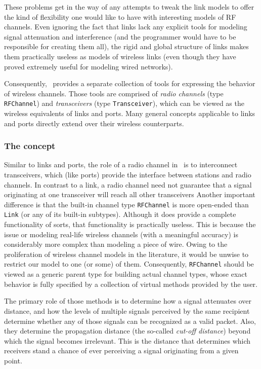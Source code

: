 These problems get in the way of any attempts to tweak the link models to
offer the kind of flexibility one would like to have with interesting models
of RF channels.
Even ignoring the fact that links lack any explicit tools for modeling
signal attenuation and interference (and the programmer would have to be
responsible for creating them all), the rigid and global structure of links
makes them practically useless as models of wireless links (even though they
have proved extremely useful for modeling wired networks).

Consequently, \smurph\ provides a separate collection of tools for expressing
the behavior of wireless channels.
Those tools are comprised of {\em radio channels\/} (type {\tt RFChannel}) and
{\em transceivers\/} (type {\tt Transceiver}),
which can be viewed as the wireless equivalents of links and ports.
Many general concepts applicable to links and ports directly extend over
their wireless counterparts.

\subsubsection{The concept}
\label{rm_to_rf_co}

Similar to links and ports, the role of a radio channel in \smurph\ is
to interconnect transceivers, which (like ports) provide the interface between
stations and radio channels.
In contrast to a link, a radio channel need not guarantee that
a signal originating at one transceiver will reach all other transceivers
Another important difference is that the built-in channel type {\tt RFChannel}
is more open-ended than {\tt Link} (or any of its built-in subtypes).
Although it does provide a complete functionality of sorts, that functionality
is practically useless.
This is because the issue or modeling real-life wireless channels (with a
meaningful accuracy) is considerably more complex than modeling a piece of
wire.
Owing to the proliferation of wireless channel models in the literature,
it would be unwise to restrict our model to one (or some) of them.
Consequently, {\tt RFChannel} should be viewed as a generic parent type for
building actual channel types, whose exact behavior is fully specified by
a collection of virtual methods provided by the user.

The primary role of those methods is to determine how a signal attenuates
over distance, and how the levels of multiple signals perceived by the same
recipient determine whether any of those signals can be recognized as a
valid packet.
Also, they determine the propagation distance (the so-called {\em cut-off
distance\/}) beyond which the signal becomes irrelevant.
This is the distance that determines which receivers stand a chance of ever
perceiving a signal originating from a given point.

